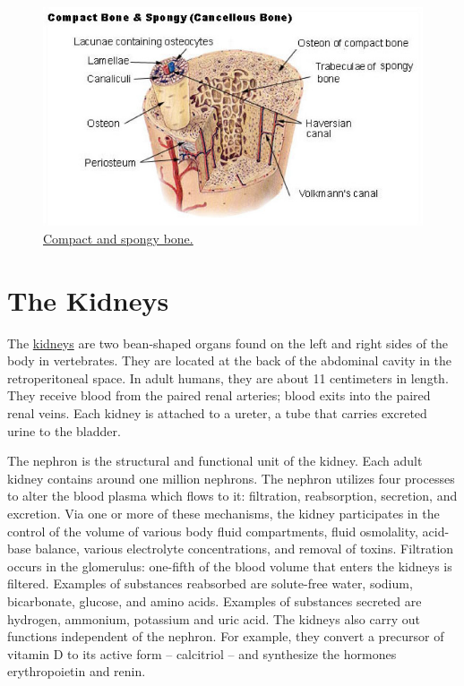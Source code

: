 \begin{figure}

{\centering \includegraphics[width=0.7\linewidth]{./figures/anatomy/bone}

}

\caption{\href{https://commons.wikimedia.org/wiki/File:Illu_compact_spongy_bone.jpg}{Compact
and spongy bone.}}\label{fig:bone}
\end{figure}

\section{The Kidneys}\label{the-kidneys}

The \href{https://en.wikipedia.org/wiki/Kidney}{kidneys} are two
bean-shaped organs found on the left and right sides of the body in
vertebrates. They are located at the back of the abdominal cavity in the
retroperitoneal space. In adult humans, they are about 11 centimeters in
length. They receive blood from the paired renal arteries; blood exits
into the paired renal veins. Each kidney is attached to a ureter, a tube
that carries excreted urine to the bladder.

The nephron is the structural and functional unit of the kidney. Each
adult kidney contains around one million nephrons. The nephron utilizes
four processes to alter the blood plasma which flows to it: filtration,
reabsorption, secretion, and excretion. Via one or more of these
mechanisms, the kidney participates in the control of the volume of
various body fluid compartments, fluid osmolality, acid-base balance,
various electrolyte concentrations, and removal of toxins. Filtration
occurs in the glomerulus: one-fifth of the blood volume that enters the
kidneys is filtered. Examples of substances reabsorbed are solute-free
water, sodium, bicarbonate, glucose, and amino acids. Examples of
substances secreted are hydrogen, ammonium, potassium and uric acid. The
kidneys also carry out functions independent of the nephron. For
example, they convert a precursor of vitamin D to its active form --
calcitriol -- and synthesize the hormones erythropoietin and renin.

